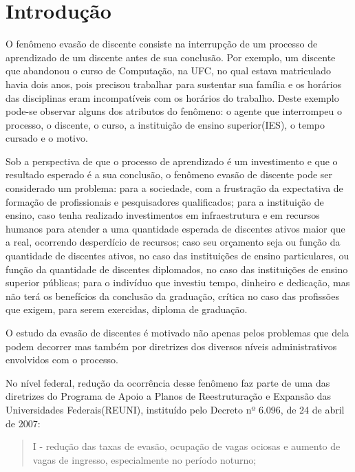 \chapter{Introdução}


O fenômeno evasão de discente consiste na interrupção de um processo de aprendizado de um discente antes de sua conclusão. Por exemplo, um discente que abandonou o curso de Computação, na UFC, no qual estava matriculado havia dois anos, pois precisou trabalhar para sustentar sua família e os horários das disciplinas eram incompatíveis com os horários do trabalho. Deste exemplo pode-se observar alguns dos atributos do fenômeno: o agente que interrompeu o processo, o discente, o curso, a instituição de ensino superior(IES), o tempo cursado e o motivo.


Sob a perspectiva de que o processo de aprendizado é um investimento e que o resultado esperado é a sua conclusão, o fenômeno evasão de discente pode ser considerado um problema: para a sociedade, com a frustração da expectativa de formação de profissionais e pesquisadores qualificados; para a instituição de ensino, caso tenha realizado investimentos em infraestrutura e em recursos humanos para atender a uma quantidade esperada de discentes ativos maior que a real, ocorrendo desperdício de recursos; caso seu orçamento seja ou função da quantidade de discentes ativos, no caso das instituições de ensino particulares, ou função da quantidade de discentes diplomados, no caso das instituições de ensino superior públicas; para o indivíduo que investiu tempo, dinheiro e dedicação, mas não terá os benefícios da conclusão da graduação, crítica no caso das profissões que exigem, para serem exercidas, diploma de graduação.


O estudo da evasão de discentes é motivado não apenas pelos problemas que dela podem decorrer mas também por diretrizes dos diversos níveis administrativos envolvidos com o processo.

No nível federal, redução da ocorrência desse fenômeno faz parte de uma das diretrizes do Programa de Apoio a Planos de Reestruturação e Expansão das Universidades Federais(REUNI), instituído pelo Decreto nº 6.096, de 24 de abril de 2007\cite{reuni}:
\begin{quote}
I - redução das taxas de evasão, ocupação de vagas ociosas e aumento de vagas de ingresso, especialmente no período noturno;
\end{quote}

